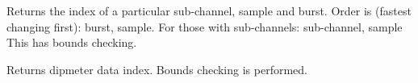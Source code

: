 \documentclass[letterpaper,10pt,english]{sphinxmanual}
\begin{document}
\begin{fulllineitems}
\begin{fulllineitems}
\end{fulllineitems}


\begin{fulllineitems}
\label{\detokenize{ref/LIS/core/FrameSet:TotalDepth.LIS.core.FrameSet.ChArTe.index}}
Returns the index of a particular sub-channel, sample and burst.
Order is (fastest changing first): burst, sample.
For those with sub-channels: sub-channel, sample
This has bounds checking.

\end{fulllineitems}


\begin{fulllineitems}
\label{\detokenize{ref/LIS/core/FrameSet:TotalDepth.LIS.core.FrameSet.ChArTe.dipmeterIndex}}
Returns dipmeter data index. Bounds checking is performed.

\end{fulllineitems}


\end{fulllineitems}

\end{document}
